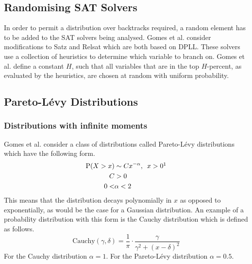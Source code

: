 \subsection{Randomising SAT Solvers}
In order to permit a distribution over backtracks required,
a random element has to be added to the SAT solvers
being analysed. Gomes et al. consider modifications to Satz and Relsat
which are both based on DPLL. These
solvers use a collection of heuristics to determine which
variable to branch on. Gomes et al. define a constant $H$,
such that all variables that are in the top $H$-percent, as evaluated by
the heuristics, are chosen at random with
uniform probability.

\subsection{Pareto-L\'evy Distributions}
\subsubsection{Distributions with infinite moments}
Gomes et al. consider a class of distributions called Pareto-L\'evy distributions which have the following form.
\begin{align*}
    \text{P}(X > x) &\sim Cx^{-\alpha}, \hspace{5pt} x > 0 \footnotemark\\
    C &> 0\\
    0 < &\alpha < 2
\end{align*}
This means that the distribution decays polynomially in $x$ as opposed to exponentially, as would be the case
for a Gaussian distribution.
An example of a probability distribution with this form is the Cauchy distribution
which is defined as follows.
\begin{equation*}
    \text{Cauchy}(\gamma, \delta) = \frac{1}{\pi}\cdot\frac{\gamma}{\gamma^{2} + (x - \delta)^{2}}
\end{equation*}
For the Cauchy distribution $\alpha = 1$. For the Pareto-L\'evy distribution $\alpha = 0.5$.
